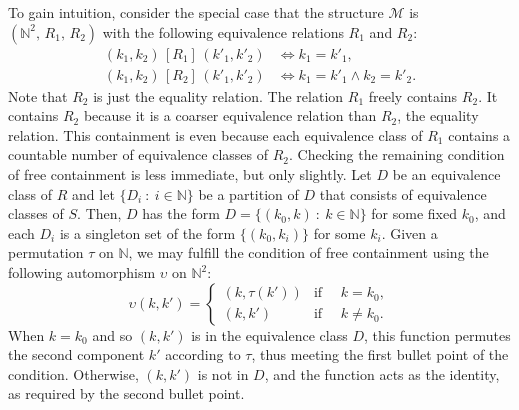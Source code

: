 \documentclass[AHL,Unicode,longabstracts,published]{cedram}
\newcommand*\MM{\mathcal{M}}
\begin{document}
To gain intuition, consider the special case that the structure $\MM$ is $(\mathbb{N}^2,\,R_1,\,R_2)$ with the following equivalence relations $R_1$ and $R_2$:
\begin{equation}\label{eqn:example-R12}
\begin{aligned}
(k_1,k_2)\,[R_1]\,(k'_1,k'_2) &\iff k_1 = k'_1,
\\[0.5ex] (k_1,k_2)\,[R_2]\,(k'_1,k'_2) &\iff k_1 = k'_1 \wedge k_2 = k'_2.
\end{aligned}
\end{equation}
Note that $R_2$ is just the equality relation. The relation $R_1$ freely contains $R_2$. It contains $R_2$ because it is a coarser equivalence relation than $R_2$, the equality relation. This containment is even because each equivalence class of $R_1$ contains a countable number of equivalence classes of $R_2$. Checking the remaining condition of free containment is less immediate, but only slightly. Let $D$ be an equivalence class of $R$ and let $\{D_i~:~i \in \mathbb{N}\}$ be a partition of $D$ that consists of equivalence classes of $S$. Then, $D$ has the form $D = \{(k_0,k)~:~k \in \mathbb{N}\}$ for some fixed $k_0$, and each $D_i$ is a singleton set of the form $\{(k_0,k_i)\}$ for some $k_i$. Given a permutation $\tau$ on $\mathbb{N}$, we may fulfill the condition of free containment using the following automorphism $\upsilon$ on $\mathbb{N}^2$:
\[
\upsilon(k,k') =
\begin{cases}
(k,\tau(k')) & \text{if }\quad k = k_0,
\\
(k,k') & \text{if }\quad k \not= k_0.
\end{cases}
\]
When $k=k_0$ and so $(k,k')$ is in the equivalence class $D$, this function permutes the second component $k'$ according to $\tau$, thus meeting the first bullet point of the condition. Otherwise, $(k,k')$ is not in $D$, and the function acts as the identity, as required by the second bullet point.
\end{document}
